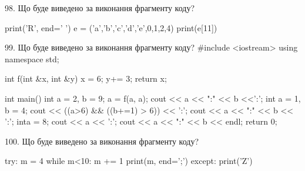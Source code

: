 \documentclass[11pt]{article}
\begin{document}
98. Що буде виведено за виконання фрагменту коду?

print('R', end=' ')
e = ('a','b','c','d','e',0,1,2,4)
print(e[11])



99. Що буде виведено за виконання фрагменту коду?
#include <iostream>
using namespace std;

int f(int &x, int &y){
    x = 6;
    y+= 3;
    return x;
}

int main(){
    int a = 2, b = 9;
    a = f(a, a);
    cout << a << ":" << b <<':';
    {
        int a = 1, b = 4;
        cout << ((a>6) && ((b+=1) > 6)) << ':';
        cout << a << ":" << b << ':';
    }
    {
        inta = 8;
        cout << a << ':';
    }
    cout << a << ":" << b << endl;
    return 0;
}



100. Що буде виведено за виконання фрагменту коду?

try:
    m = 4
    while m<10:
        m += 1
    print(m, end=';')
except:
    print('Z')



\newpage
\end{document}
